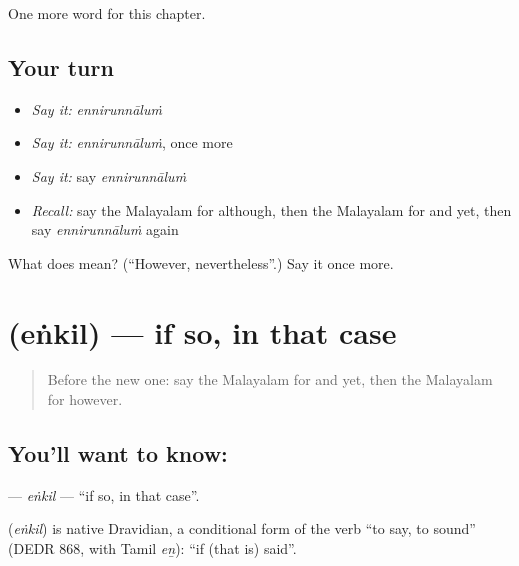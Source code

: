 \begin{grammarlens}[title={What you've built}]
One more word for this chapter.
\end{grammarlens}

\subsection*{Your turn}
\begin{itemize}
\raggedright
  \item \emph{Say it:} \emph{ennirunnāluṁ}
  \item \emph{Say it:} \emph{ennirunnāluṁ}, once more
  \item \emph{Say it:} say \emph{ennirunnāluṁ}
  \item \emph{Recall:} say the Malayalam for although, then the Malayalam for and yet, then say \emph{ennirunnāluṁ} again
\end{itemize}

\begin{tcolorbox}[breakable,colback=teal!4,colframe=teal!35!black,title={Before you move on}]
What does  mean? (\textquotedblleft{}However, nevertheless\textquotedblright{}.) Say it once more.
\end{tcolorbox}
\section[\texorpdfstring{\ml{എങ്കിൽ} (eṅkil)}{എങ്കിൽ (eṅkil)}]{ (eṅkil) — if so, in that case}

\label{lesson:ML-C241-enkil}



\begin{quote}
Before the new one: say the Malayalam for and yet, then the Malayalam for however.
\end{quote}

\subsection*{You'll want to know: }
\textbf{} — \emph{eṅkil} — \textquotedblleft{}if so, in that case\textquotedblright{}.

\begin{cousinweb}
\textbf{} (\emph{eṅkil}) is native Dravidian, a conditional form of the verb \textquotedblleft{}to say, to sound\textquotedblright{} (DEDR 868, with Tamil \emph{eṉ}): \textquotedblleft{}if (that is) said\textquotedblright{}.
\end{cousinweb}

